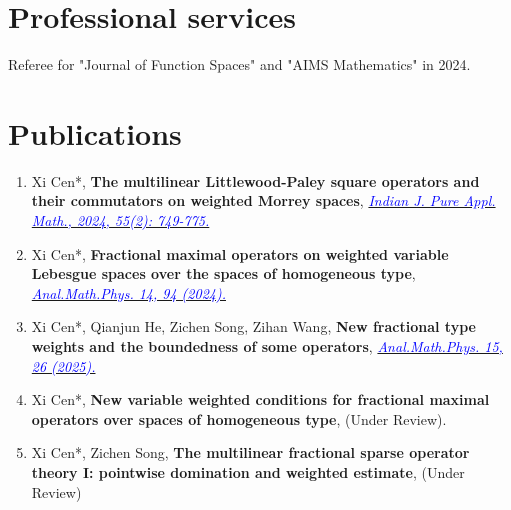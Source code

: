 \documentclass{article}
\newcommand{\cvsection}[1]{\section*{\rmfamily#1}}
\begin{document}
\cvsection{Professional services}	
Referee for "Journal of Function Spaces" and "AIMS Mathematics" in 2024.



\cvsection{Publications}	
\begin{enumerate}[label=~~\bf{\arabic*.}~, leftmargin=*]
\item 
Xi Cen*,  \textbf{The multilinear Littlewood-Paley square operators and their commutators on weighted Morrey spaces},  \href{https://doi.org/10.1007/s13226-023-00406-1}{\it\textcolor{blue}{Indian J. Pure Appl. Math., 2024, 55(2): 749-775.}}
\item Xi Cen*, 
\textbf{Fractional maximal operators on weighted variable Lebesgue spaces over the spaces of homogeneous type}, \href{https://doi.org/10.1007/s13324-024-00955-6}{\it \textcolor{blue}{Anal.Math.Phys. 14, 94 (2024).}}\\
\item Xi Cen*, Qianjun He, Zichen Song, Zihan Wang, 
\textbf{New fractional type weights and the boundedness of some operators}, \href{https://doi.org/10.1007/s13324-025-01027-z}{\it \textcolor{blue}{ Anal.Math.Phys. 15, 26 (2025).}}\\ 
\item Xi Cen*, 
\textbf{New variable weighted conditions for fractional maximal operators over spaces of homogeneous type}, (Under Review).\\
\item Xi Cen*, Zichen Song,
\textbf{The multilinear fractional sparse operator theory I: pointwise domination and weighted estimate},  (Under Review)\\


\end{enumerate}
\end{document}
